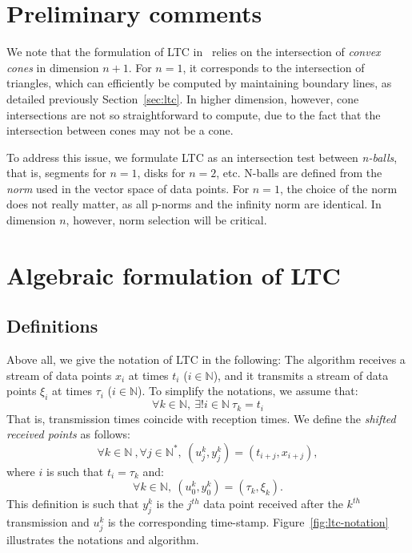 \section{Preliminary comments}

We note that the formulation of LTC  in~\cite{schoellhammer2004lightweight}
relies on the intersection of  \emph{convex cones} in dimension $n+1$. For
$n=1$, it corresponds to  the intersection of triangles, which can efficiently
be computed by  maintaining boundary lines, as detailed
previously Section~\ref{sec:ltc}. In higher dimension, however, cone intersections are
not so straightforward to compute, due  to the fact that the intersection
between cones may not be a cone.

To address this issue, we formulate LTC as an intersection test between
\emph{n-balls}, that is, segments for $n=1$, disks for
$n=2$, etc. N-balls are defined from the \emph{norm} used in
the vector space of data points. For $n=1$, the choice of the norm does
not really matter, as all p-norms and the infinity norm are identical.
In dimension $n$, however, norm selection will be critical.

\section{Algebraic formulation of LTC}

\subsection{Definitions}

Above all, we give the notation of LTC in the
following: The algorithm receives a stream of data points $x_i$ at times $t_i$
($i \in \mathbb{N}$), and it transmits a stream of data points $\xi_i$ at times
$\tau_i$ ($i \in \mathbb{N}$). To simplify the notations, we assume that:
\begin{equation}
\forall k \in \mathbb{N}, \  \exists ! i \in \mathbb{N} \  \tau_k = t_i
\end{equation}
That is, transmission times coincide with reception times.
We define the \emph{shifted received points} as follows:
\begin{equation}
\label{eq:ltc-2}
\forall k \in \mathbb{N}\ , \forall j \in \mathbb{N^*},\ (u^k_j, y^k_j) = (t_{i+j}, x_{i+j}), 
\end{equation}
where $i$ is such that $t_i = \tau_k$ and:
\begin{equation}
\label{eq:ltc-3}
\forall k \in \mathbb{N},\  (u^k_0, y^k_0) = (\tau_k, \xi_k).
\end{equation}
This definition is such that $y^k_j$ is the $j^{th}$ data point received
after the $k^{th}$ transmission and $u^k_j$ is the corresponding time-stamp.
Figure~\ref{fig:ltc-notation} illustrates the notations and algorithm.

